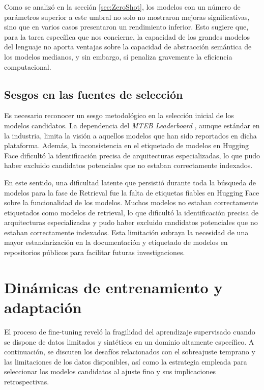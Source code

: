 Como se analizó en la sección \ref{sec:ZeroShot}, los modelos con un número de parámetros superior a este umbral no solo no mostraron mejoras significativas, sino que en varios casos presentaron un rendimiento inferior. Esto sugiere que, para la tarea específica que nos concierne, la capacidad de los grandes modelos del lenguaje no aporta ventajas sobre la capacidad de abstracción semántica de los modelos medianos, y sin embargo, sí penaliza gravemente la eficiencia computacional.

\subsection{Sesgos en las fuentes de selección}
\noindent Es necesario reconocer un sesgo metodológico en la selección inicial de los modelos candidatos. La dependencia del \textit{MTEB Leaderboard} \cite{mteb-leaderboard}, aunque estándar en la industria, limita la visión a aquellos modelos que han sido reportados en dicha plataforma. Además, la inconsistencia en el etiquetado de modelos en Hugging Face dificultó la identificación precisa de arquitecturas especializadas, lo que pudo haber excluido candidatos potenciales que no estaban correctamente indexados.

En este sentido, una dificultad latente que persistió durante toda la búsqueda de modelos para la fase de Retrieval fue la falta de etiquetas fiables en Hugging Face sobre la funcionalidad de los modelos. Muchos modelos no estaban correctamente etiquetados como modelos de retrieval, lo que dificultó la identificación precisa de arquitecturas especializadas y pudo haber excluido candidatos potenciales que no estaban correctamente indexados. Esta limitación subraya la necesidad de una mayor estandarización en la documentación y etiquetado de modelos en repositorios públicos para facilitar futuras investigaciones.

\section{Dinámicas de entrenamiento y adaptación}

\noindent El proceso de fine-tuning reveló la fragilidad del aprendizaje supervisado cuando se dispone de datos limitados y sintéticos en un dominio altamente específico. A continuación, se discuten los desafíos relacionados con el sobreajuste temprano y las limitaciones de los datos disponibles, así como la estrategia empleada para seleccionar los modelos candidatos al ajuste fino y sus implicaciones retrospectivas.

